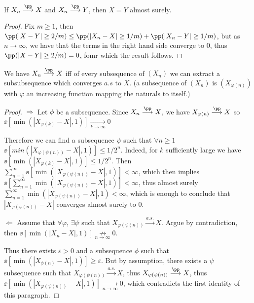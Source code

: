 \documentclass[../main.tex]{subfiles}
\begin{document}
  \begin{lemma}
      If $X_n \overset{\pp}{\longrightarrow} X$ and $X_n \overset{\pp}{\longrightarrow} Y$, then $X = Y$  almost surely.
  \end{lemma}
  \begin{proof}
    Fix $m \geq 1$, then $\pp(|X - Y| \geq 2/m) \leq \pp(|X_n - X| \geq 1/m) +  
    \pp(|X_n - Y| \geq 1/m)$, but as $n \to \infty$, we have that the terms in
    the right hand side converge to $0$, thus $\pp(|X - Y| \geq 2/m) = 0$,
    fomr which the result follows.
  \end{proof}
   \begin{lemma}
     We have $X_n \overset{\pp}{\longrightarrow} X$ iff of every subsequence
     of $(X_n)$ we can extract a subsubsequence which converges $a.s$ to $X$.
     (a subsequence of $(X_n)$ is $(X_{\varphi(n)})$ with $\varphi$ an increasing
     function mapping the naturals to itself.)
   \end{lemma}
   \begin{proof}
      $\boxed{\Rightarrow}$ Let $\phi$ be a subsequence. Since $X_n
      \overset{\pp}{\longrightarrow} X$, we have $X_{\varphi(n)}
      \overset{\pp}{\longrightarrow} X$ so $\ee[\min(|X_{\varphi(k)} - X|, 1)]
      \underset{k \to \infty}{\longrightarrow} 0$

      \vspace{0.3em}

      \noindent
      Therefore we can find a subsequence $\psi$ such that $\forall n \geq 1$
      $\ee[min(|X_{\varphi(\psi(n))} - X|, 1)] \leq 1/2^n$. 
      Indeed, for $k$ sufficiently large we have $\ee[\min(|X_{\varphi(k)} - X|
      , 1)] \leq 1/2^n$. Then $\sum_{n=1}^\infty
      \ee[\min(|X_{\varphi(\psi(n))} - X|, 1)] < \infty$, which then implies
      $\ee[\sum_{n=1}^\infty
      \min(|X_{\varphi(\psi(n))} - X|, 1)] < \infty$, thus almost surely
      $\sum_{n=1}^\infty \min(|X_{\varphi(\psi(n))} -X|, 1) < \infty$, which
      is enough to conclude that $|X_{\varphi(\psi(n))} -X|$ 
      converges almost surely to $0$.

      \vspace{1em}
      \noindent
      $\boxed{\Leftarrow}$ Assume that $\forall \varphi$, $\exists \psi$ such
      that $X_{\varphi(\psi(n))} \overset{a.s.}{\longrightarrow} X$. Argue by
      contradiction, then $\ee[\min(|X_n - X|, 1)] \underset{n \to
      \infty}{\not\rightarrow}0$.

      \vspace{0.3em}
      \noindent

      Thus there exists $\varepsilon>0$ and a subsequence $\phi$ such that
      $\ee[\min(|X_{\phi(n)} - X|, 1)] \geq \varepsilon$. But by assumption,
      there exists a $\psi$ subsequence such that $X_{\varphi(\psi(n))}
      \overset{a.s.}{\longrightarrow} X$, thus $X_{\varphi(\psi(n))}
      \overset{\pp}{\longrightarrow} X$, thus $\ee[\min(|X_{\varphi(\psi(n))}
      - X|, 1)] \underset{n \to \infty}{\longrightarrow} 0$, which contradicts
      the first identity of this paragraph.
   \end{proof}
\end{document}
